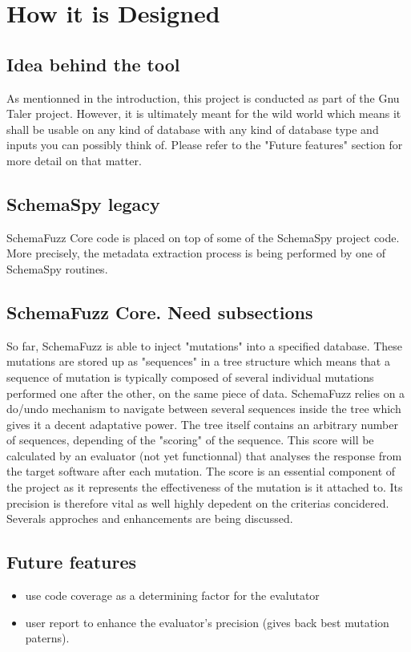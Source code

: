 \documentclass{article}
\begin{document}
	
	\section{How it is Designed}
		\subsection{Idea behind the tool}
		
As mentionned in the introduction, this project is conducted as part of the Gnu Taler project. However, it is ultimately meant for the wild world which means it shall be usable on any kind of database with any kind of database type and inputs you can possibly think of.
Please refer to the "Future features" section for more detail on that matter.
			
		\subsection{SchemaSpy legacy}
		
SchemaFuzz Core code is placed on top of some of the SchemaSpy project code. More precisely, the metadata extraction process is being performed by one of SchemaSpy routines. 

		\subsection{SchemaFuzz Core. Need subsections}
So far, SchemaFuzz is able to inject "mutations" into a specified database. These mutations
are stored up as "sequences" in a tree structure which means that a sequence of mutation is typically composed of several individual mutations performed one after the other, on the same piece of data.
SchemaFuzz relies on a do/undo mechanism to navigate between several sequences inside the tree which gives it a decent adaptative power.
The tree itself contains an arbitrary number of sequences, depending of the "scoring" of the sequence. This score will be calculated by an evaluator (not yet functionnal) that analyses the response from the target software after each mutation.
The score is an essential component of the project as it represents the effectiveness of the mutation is it attached to. Its precision is therefore vital as well highly depedent on the criterias concidered. 
Severals approches and enhancements are being discussed.
		\subsection{Future features}
		\begin{itemize}
			\item use code coverage as a determining factor for the evalutator
			\item user report to enhance the evaluator's precision (gives back best mutation paterns).
		\end{itemize}
			
\end{document}
